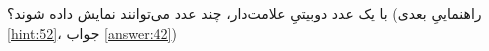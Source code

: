 \section{}
\paragraph{}\label{hint:169}
با یک عدد دوبیتیِ علامت‌دار، چند عدد می‌توانند نمایش داده شوند؟ (راهنماییِ بعدی \ref{hint:52}، جواب \ref{answer:42})